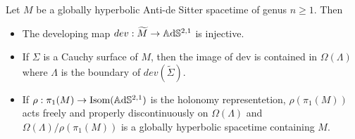 \begin{proposition}\label{prop:GH_geometry}
    Let $M$ be a globally hyperbolic Anti-de Sitter spacetime of genus $n\geq 1$. Then
    \begin{itemize}
        \item The developing map $dev: \widetilde{M} \to\mathbb{A}\mathrm{d}\mathbb{S}^{2,1}$ is injective.
        \item If $\Sigma$ is a Cauchy surface of $M$, then the image of dev is contained in $\Omega(\Lambda)$ where $\Lambda$ is the boundary of $dev(\widetilde{\Sigma})$.
        \item If $\rho : \pi_1(M) \to \text{Isom}(\mathbb{A}\mathrm{d}\mathbb{S}^{2,1})$ is the holonomy representetion, $\rho(\pi_1(M))$ acts freely and properly discontinuously on $\Omega(\Lambda)$ and $\Omega(\Lambda) / \rho(\pi_1(M))$ is a globally hyperbolic spacetime containing $M$.
    \end{itemize}
\end{proposition}
